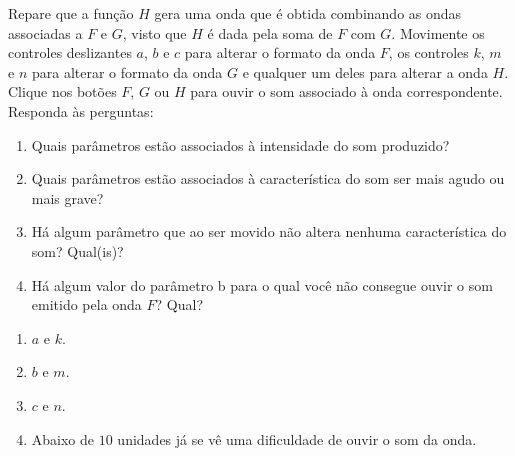 \documentclass[10 pt,usenames,dvipsnames, oneside]{article}
\begin{document}
Repare que a função $H$ gera uma onda que é obtida combinando as ondas associadas a $F$ e $G$, visto que $H$ é dada pela soma de $F$ com $G$. Movimente os controles deslizantes $a$, $b$ e $c$ para alterar o formato da onda $F$, os controles $k$, $m$ e $n$ para alterar o formato da onda $G$ e qualquer um deles para alterar a onda $H$. Clique nos botões $F$, $G$ ou $H$ para ouvir o som associado à onda correspondente. Responda às perguntas:

\begin{enumerate}
\item Quais parâmetros estão associados à intensidade do som produzido?
\item Quais parâmetros estão associados à característica do som ser mais agudo ou mais grave?
\item Há algum parâmetro que ao ser movido não altera nenhuma característica do som? Qual(is)?
\item Há algum valor do parâmetro b para o qual você não consegue ouvir o som emitido pela onda $F$? Qual?
\end{enumerate}

\ifdefined\prof
\begin{solucao}

\begin{enumerate}
\item $a$ e $k$.
\item $b$ e $m$.
\item $c$ e $n$.
\item Abaixo de $10$ unidades já se vê uma dificuldade de ouvir o som da onda.
\end{enumerate}
\end{solucao}
\fi
\end{document}

